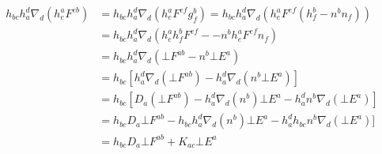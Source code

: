 \documentclass[prd]{revtex4}
\begin{document}
\begin{align}
h_{bc}  h_a^d \nabla_d (h_e^a F^{eb}) &=h_{bc} h_a^d \nabla_d (h_e^a F^{ef} g_f^b) = h_{bc} h_a^d \nabla_d (h_e^a F^{ef} (h_f^b - n^b n_f)) \nonumber \\
							   &=h_{bc} h_a^d \nabla_d (h_e^a h_f^b F^{ef} -  - n^b h_e^a F^{ef} n_f) \nonumber \\
							   &=h_{bc} h_a^d \nabla_d (\bot F^{ab}   - n^b \bot E^a) \nonumber \\
							   &=h_{bc} [h_a^d \nabla_d (\bot F^{ab} )  - h_a^d \nabla_d (n^b \bot E^a)] \nonumber \\
							   &=h_{bc} [D_a (\bot F^{ab} )  - h_a^d \nabla_d (n^b) \bot E^a - h_a^d n^b \nabla_d (\bot E^a)] \nonumber \\
							   &=h_{bc} D_a \bot F^{ab}  -h_{bc} h_a^d \nabla_d (n^b) \bot E^a  - h_a^d h_{bc} n^b \nabla_d (\bot E^a)] \nonumber \\
							   &=h_{bc} D_a \bot F^{ab}  + K_{ac} \bot E^a
\end{align}
\end{document}
